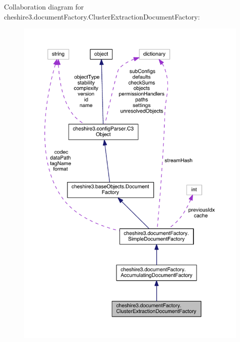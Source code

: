 Collaboration diagram for cheshire3.\-document\-Factory.\-Cluster\-Extraction\-Document\-Factory\-:
\nopagebreak
\begin{figure}[H]
\begin{center}
\leavevmode
\includegraphics[width=350pt]{classcheshire3_1_1document_factory_1_1_cluster_extraction_document_factory__coll__graph}
\end{center}
\end{figure}
